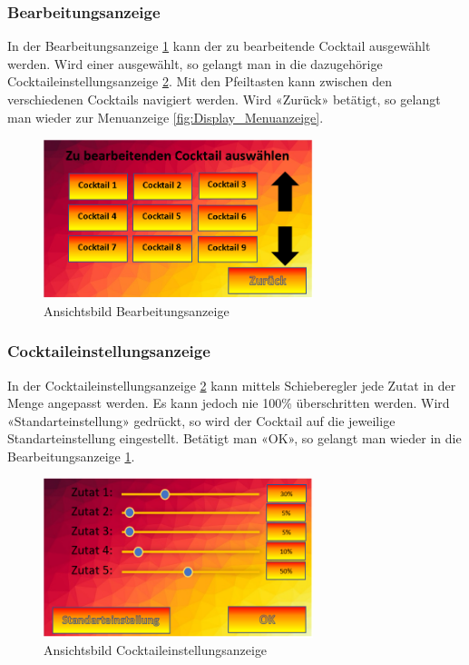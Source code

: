\subsubsection{Bearbeitungsanzeige}\label{subsubsec:Display_Bearbeitungsanzeige}

In der Bearbeitungsanzeige \ref{fig:Display_Bearbeitungsanzeige} kann der zu bearbeitende Cocktail ausgewählt werden. Wird einer ausgewählt, so gelangt man in die dazugehörige Cocktaileinstellungsanzeige \ref{fig:Display_Cocktaileinstellungsanzeige}. Mit den Pfeiltasten kann zwischen den verschiedenen Cocktails navigiert werden. Wird «Zurück» betätigt, so gelangt man wieder zur Menuanzeige \ref{fig:Display_Menuanzeige}. 

\begin{figure}[h!]
\centering
\includegraphics[width=0.7\textwidth]{graphics/Display_Bearbeitungsanzeige.png}
\caption{Ansichtsbild Bearbeitungsanzeige}
\label{fig:Display_Bearbeitungsanzeige}
\end{figure}

\subsubsection{Cocktaileinstellungsanzeige}\label{subsubsec:Display_Cocktaileinstellungsanzeige}

In der Cocktaileinstellungsanzeige \ref{fig:Display_Cocktaileinstellungsanzeige} kann mittels Schieberegler jede Zutat in der Menge angepasst werden. Es kann jedoch nie 100\% überschritten werden. Wird «Standarteinstellung» gedrückt, so wird der Cocktail auf die jeweilige Standarteinstellung eingestellt. Betätigt man «OK», so gelangt man wieder in die Bearbeitungsanzeige \ref{fig:Display_Bearbeitungsanzeige}.

\begin{figure}[h!]
\centering
\includegraphics[width=0.7\textwidth]{graphics/Display_Cocktaileinstellungsanzeige.png}
\caption{Ansichtsbild Cocktaileinstellungsanzeige}
\label{fig:Display_Cocktaileinstellungsanzeige}
\end{figure}

